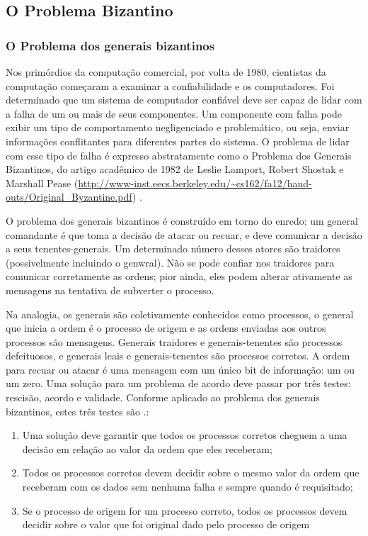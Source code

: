     \subsection{O Problema Bizantino}
    
        \subsubsection{O Problema dos generais bizantinos}
        
           Nos primórdios da computação comercial, por volta de 1980, cientistas da computação começaram a examinar a confiabilidade e os computadores. Foi determinado que um sistema de computador confiável deve ser capaz de lidar com a falha de um ou mais de seus componentes. Um componente com falha pode exibir um tipo de comportamento negligenciado e problemático, ou seja, enviar informações conflitantes para diferentes partes do sistema. O problema de lidar com esse tipo de falha é expresso abstratamente como o Problema dos Generais Bizantinos, do artigo acadêmico de 1982 de Leslie Lamport, Robert Shostak e Marshall Pease (\url{http://www-inst.eecs.berkeley.edu/~cs162/fa12/hand-outs/Original_Byzantine.pdf}) \cite{blockchain_pratical_guide}.
           
           O problema dos generais bizantinos é construído em torno do enredo: um general comandante é que toma a decisão de atacar ou recuar, e deve comunicar a decisão a seus tenentes-generais. Um determinado número desses atores são traidores (possivelmente incluindo o genwral). Não se pode confiar nos traidores para comunicar corretamente as ordens; pior ainda, eles podem alterar ativamente as mensagens na tentativa de subverter o processo\cite{blockchain_pratical_guide}.
    
            Na analogia, os generais são coletivamente conhecidos como processos, o general que inicia a ordem é o processo de origem e as ordens enviadas aos outros processos são mensagens. Generais traidores e generais-tenentes são processos defeituosos, e generais leais e generais-tenentes são processos corretos. A ordem para recuar ou atacar é uma mensagem com um único bit de informação: um ou um zero. Uma solução para um problema de acordo deve passar por três testes: rescisão, acordo e validade. Conforme aplicado ao problema dos generais bizantinos, estes três testes são \cite{blockchain_pratical_guide}.:
    
               \begin{enumerate}
                    \item Uma solução deve garantir que todos os processos corretos cheguem a uma decisão em relação ao valor da ordem que eles receberam;
                    \item Todos os processos corretos devem decidir sobre o mesmo valor da ordem que receberam com os dados sem nenhuma falha e sempre quando é requisitado;
                    \item Se o processo de origem for um processo correto, todos os processos devem decidir sobre o valor que foi original dado pelo processo de origem
                \end{enumerate}
    
